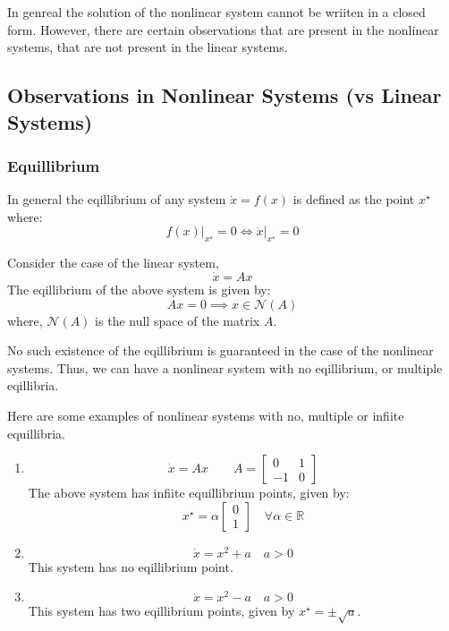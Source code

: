 In genreal the solution of the nonlinear system cannot be wriiten in a closed form. However, there are
certain observations that are present in the nonlinear systems, that are not present in the linear systems.

\subsection{Observations in Nonlinear Systems (vs Linear Systems)}

\subsubsection{Equillibrium}
In general the eqillibrium of any system \(\dot{x} = f(x)\) is defined as the point \(x^{\star}\) where:
\[
    \left. f(x) \right|_{x^{\star}} = 0  \iff \left. \dot{x} \right|_{x^{\star}} = 0 
\]
\begin{example}
    Consider the case of the linear system,
    \[
        \dot{x} = A x
    \]
    The eqillibrium of the above system is given by:
    \[
        Ax = 0 \implies x \in \mathcal{N}(A)
    \]
    where, \(\mathcal{N}(A)\) is the null space of the matrix \(A\).
\end{example}

No such existence of the eqillibrium is guaranteed in the case of the nonlinear systems. 
Thus, we can have a nonlinear system with no eqillibrium, or multiple eqillibria.
\begin{example}
Here are some examples of nonlinear systems with no, multiple or infiite equillibria.
    \begin{enumerate}
        \item
        \[
            \dot{x} = Ax \quad \quad A = \begin{bmatrix}
                0 & 1 \\
                -1 & 0  
            \end{bmatrix}
        \]
        The above system has infiite equillibrium points, given by:
        \[
            x^{\star} = \alpha \begin{bmatrix}
                0 \\ 1
            \end{bmatrix} \quad \forall \alpha \in \mathbb{R}
        \]
        
        \item
        \[
            \dot{x} = x^{2} + a \quad a > 0 
        \]
        This system has no eqillibrium point.

        \item
        \[
            \dot{x} = x^{2} - a \quad a > 0
        \]
        This system has two eqillibrium points, given by \(x^{\star} = \pm \sqrt{a}\).
    \end{enumerate}
\end{example}

